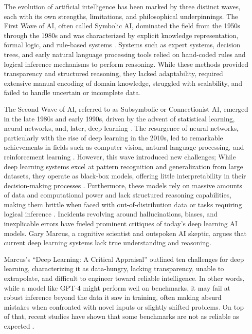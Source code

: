 The evolution of artificial intelligence has been marked by three distinct waves, each with its own strengths, limitations, and philosophical underpinnings. The First Wave of AI, often called Symbolic AI, dominated the field from the 1950s through the 1980s and was characterized by explicit knowledge representation, formal logic, and rule-based systems \cite{newell1956logic, McCarthy1969-MCCSPP}. Systems such as expert systems, decision trees, and early natural language processing tools relied on hand-coded rules and logical inference mechanisms to perform reasoning. While these methods provided transparency and structured reasoning, they lacked adaptability, required extensive manual encoding of domain knowledge, struggled with scalability, and failed to handle uncertain or incomplete data.

The Second Wave of AI, referred to as Subsymbolic or Connectionist AI, emerged in the late 1980s and early 1990s, driven by the advent of statistical learning, neural networks, and, later, deep learning \cite{lecun2015deep}. The resurgence of neural networks, particularly with the rise of deep learning in the 2010s, led to remarkable achievements in fields such as computer vision, natural language processing, and reinforcement learning \cite{cv_deep_learning_survey, nlp_deep_learning_survey, rl_deep_learning_survey}. However, this wave introduced new challenges; While deep learning systems excel at pattern recognition and generalization from large datasets, they operate as black-box models, offering little interpretability in their decision-making processes \cite{zhang2024neurosymbolicaiexplainabilitychallenges}. Furthermore, these models rely on massive amounts of data and computational power and lack structured reasoning capabilities, making them brittle when faced with out-of-distribution data or tasks requiring logical inference \cite{marcus2020nextdecadeai}. Incidents revolving around hallucinations, biases, and inexplicable errors have fueled prominent critiques of today’s deep learning AI models. Gary Marcus, a cognitive scientist and outspoken AI skeptic, argues that current deep learning systems lack true understanding and reasoning. 

Marcus's ``Deep Learning: A Critical Appraisal'' \cite{marcus2018deeplearningcriticalappraisal} outlined ten challenges for deep learning, characterizing it as data-hungry, lacking transparency, unable to extrapolate, and difficult to engineer toward reliable intelligence. In other words, while a model like GPT-4 might perform well on benchmarks, it may fail at robust inference beyond the data it saw in training, often making absurd mistakes when confronted with novel inputs or slightly shifted problems. On top of that, recent studies have shown that some benchmarks are not as reliable as expected \cite{reuel2024betterbenchassessingaibenchmarks}. 


